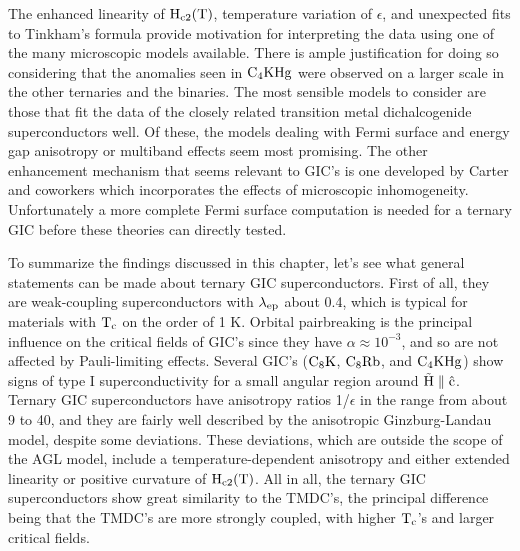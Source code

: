         The enhanced linearity of $\rm H_{c2}(T)$, temperature variation of
$\epsilon$, and unexpected fits to Tinkham's formula provide motivation for
interpreting the data using  one of the many  microscopic models available.
There  is ample justification  for doing so  considering that the anomalies
seen in  $\rm  C_4KHg$ were   observed on  a   larger  scale  in the  other
ternaries\cite{iye82} and the  binaries.\cite{koike80,kobayashi85} The most
sensible  models to consider are  those that fit  the data  of  the closely
related transition  metal dichalcogenide superconductors well.  Of  these,
the models  dealing with Fermi   surface   and   energy gap anisotropy   or
multiband effects seem most promising. The other enhancement mechanism that
seems   relevant to      GIC's   is  one     developed   by  Carter     and
coworkers\cite{carter81}   which incorporates  the   effects  of microscopic
inhomogeneity.  Unfortunately a more complete Fermi surface  computation is
needed for a ternary GIC before these theories can directly tested.

        To summarize the findings discussed in this chapter, let's see what
general statements can be made about ternary GIC superconductors.  First of
all, they are weak-coupling superconductors with $\rm \lambda_{ep}$ about 0.4, which
is   typical  for   materials  with   $\rm    T_c$ on   the   order    of 1 K.\cite{mcmillan68} Orbital pairbreaking is the principal influence on
the critical fields of GIC's since they have $\alpha  \approx 10^{-3}$, and
so are not  affected by Pauli-limiting effects.   Several GIC's ($\rm   C_8K$, $\rm
C_8Rb$,  and  $\rm C_4KHg$) show signs  of  type  I superconductivity for a
small angular region around $\rm  \vec{H}  \parallel \hat{c}$.  Ternary GIC
superconductors have anisotropy ratios 1/$\epsilon$ in the range from about
9   to 40, and    they  are  fairly    well  described by  the  anisotropic
Ginzburg-Landau model, despite  some  deviations.  These deviations,  which
are  outside the  scope of the  AGL model, include a  temperature-dependent
anisotropy and  either extended  linearity  or  positive curvature  of $\rm
H_{c2}(T)$.    All  in   all,  the ternary GIC superconductors   show great
similarity to  the TMDC's, the  principal difference being that  the TMDC's
are more strongly coupled, with higher $\rm T_c$'s and larger critical fields.

